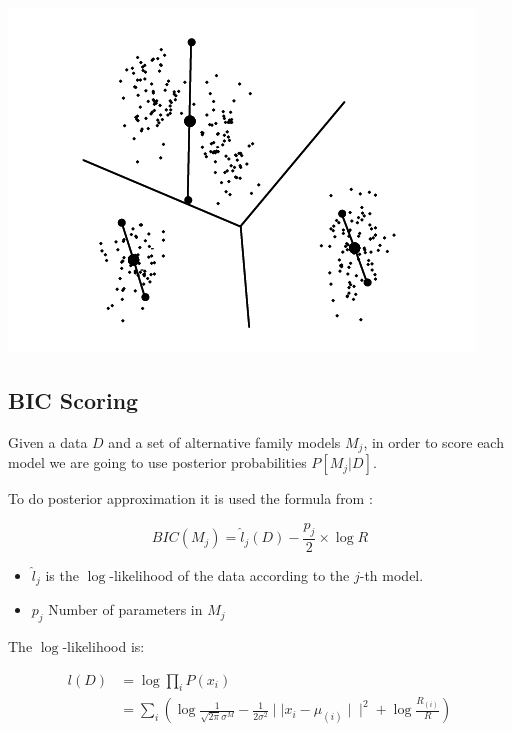 \documentclass[12pt, a4paper]{article}
\begin{document}
\begin{minipage}[f]{\linewidth}
  \includegraphics[width=\textwidth]{xmeans_1}
  \captionsetup{type=figure}
  \label{fig:centroid_split}
\end{minipage}

\subsection{BIC Scoring}\label{sub:bic}
Given a data $D$ and a set of alternative family models $M_j$, in order to score each model we are going to use posterior probabilities $P[M_j|D]$.

To do posterior approximation it is used the formula from \cite{bic}:

\begin{equation}
BIC(M_j) = \widehat{l}_j(D) - \frac{p_j}{2} \times \log{R}
\end{equation}

\begin{itemize}
  \item $\widehat{l}_j$ is the $\log$-likelihood of the data according to the $j$-th model.
 \item $p_j$ Number of parameters in $M_j$
\end{itemize}

The $\log$-likelihood is:

\begin{subequations}
  \begin{align}
  l(D) &= \log{\prod_i P(x_i)}\\
  &= \sum_i \left( \log{\frac{1}{\sqrt{2\pi}\sigma^M}} - \frac{1}{2\sigma^2} \mid\mid x_i - \mu_{(i)} \mid\mid^2 + \log{\frac{R_{(i)}}{R}} \right)\label{eq:1}
  \end{align}
\end{subequations}
\end{document}
